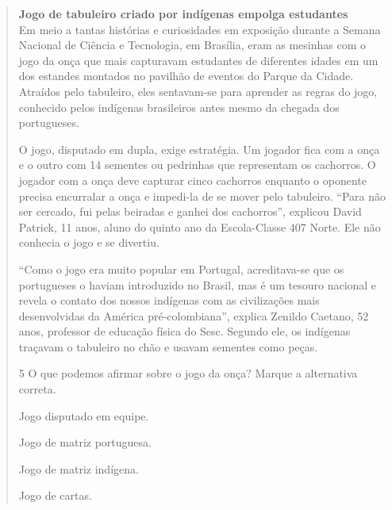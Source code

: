 \begin{quote}
\textbf{Jogo de tabuleiro criado por indígenas empolga estudantes}\\
Em meio a tantas histórias e curiosidades em exposição durante a Semana
Nacional de Ciência e Tecnologia, em Brasília, eram as mesinhas com o
jogo da onça que mais capturavam estudantes de diferentes idades em um
dos estandes montados no pavilhão de eventos do Parque da Cidade.
Atraídos pelo tabuleiro, eles sentavam-se para aprender as regras do
jogo, conhecido pelos indígenas brasileiros antes mesmo da chegada dos
portugueses.

O jogo, disputado em dupla, exige estratégia. Um jogador fica com a onça
e o outro com 14 sementes ou pedrinhas que representam os cachorros. O
jogador com a onça deve capturar cinco cachorros enquanto o oponente
precisa encurralar a onça e impedi-la de se mover pelo tabuleiro. ``Para
não ser cercado, fui pelas beiradas e ganhei dos cachorros'', explicou
David Patrick, 11 anos, aluno do quinto ano da Escola-Classe 407 Norte.
Ele não conhecia o jogo e se divertiu.

``Como o jogo era muito popular em Portugal, acreditava-se que os
portugueses o haviam introduzido no Brasil, mas é um tesouro nacional e
revela o contato dos nossos indígenas com as civilizações mais
desenvolvidas da América pré-colombiana'', explica Zenildo Caetano, 52
anos, professor de educação física do Sesc. Segundo ele, os indígenas
traçavam o tabuleiro no chão e usavam sementes como peças.


\num{5} O que podemos afirmar sobre o jogo da onça? Marque a alternativa correta.

\begin{boxlist}
 Jogo disputado em equipe.

 Jogo de matriz portuguesa.

 Jogo de matriz indígena.

 Jogo de cartas.
\end{boxlist}

\end{quote}
